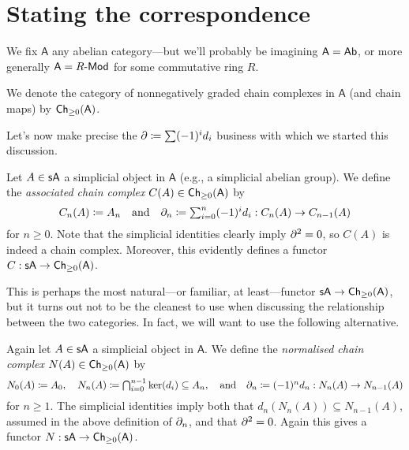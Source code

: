 
\renewcommand{\A}{\mathsf{A}}

\section{Stating the correspondence}

We fix $\A$ any abelian category---but we'll probably be imagining $\A
= \Ab$, or more generally $\A = R\text{-}\Mod$ for some commutative
ring $R$.

\begin{notation}
  We denote the category of nonnegatively graded chain complexes in
  $\A$ (and chain maps) by $\Ch_{\ge 0}(\A)$.
\end{notation}

Let's now make precise the $\partial \coloneqq \sum (-1)^i d_i$ business
with which we started this discussion.

\begin{definition}
  Let $A \in \s\A$ a simplicial object in $\A$ (e.g., a simplicial
  abelian group). We define the \textit{associated chain complex}
  $C(A) \in \Ch_{\ge 0}(\A)$ by
  \[
  \textstyle{C_n(A) \coloneqq A_n \quad\text{and}\quad \partial_n
    \coloneqq \sum_{i=0}^n (-1)^i d_i : C_n(A) \to C_{n-1}(A)}
  \]
  for $n \ge 0$. Note that the simplicial identities clearly imply
  $\partial^2 = 0$, so $C(A)$ is indeed a chain complex. Moreover, this
  evidently defines a functor $C : \s\A \to \Ch_{\ge 0}(\A)$.
\end{definition}

This is perhaps the most natural---or familiar, at least---functor
$\s\A \to \Ch_{\ge 0}(\A)$, but it turns out not to be the cleanest to
use when discussing the relationship between the two categories. In
fact, we will want to use the following alternative.

\begin{definition}
  Again let $A \in \s\A$ a simplicial object in $\A$. We define the
  \textit{normalised chain complex} $N(A) \in \Ch_{\ge 0}(\A)$ by
  \[
  N_0(A) \coloneqq A_0, \quad \textstyle{N_n(A) \coloneqq
    \bigcap_{i=0}^{n-1} \ker(d_i) \subseteq A_n, \quad\text{and}\quad
    \partial_n \coloneqq (-1)^n d_n : N_n(A) \to N_{n-1}(A)}
  \]
  for $n \ge 1$. The simplicial identities imply both that
  $d_n(N_n(A)) \subseteq N_{n-1}(A)$, assumed in the above definition
  of $\partial_n$, and that $\partial^2 = 0$. Again this gives a functor $N :
  \s\A \to \Ch_{\ge 0}(\A)$.
\end{definition}

